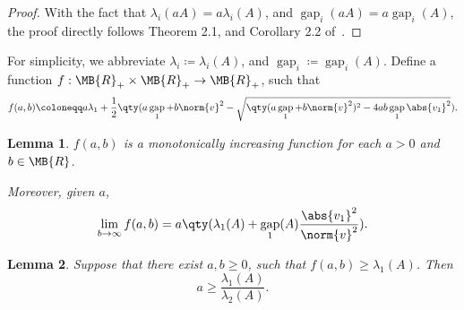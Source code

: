 \documentclass[nobib]{my-handout}
\newtheorem{lemma}{Lemma}
\theoremstyle{definition}
\theoremstyle{remark}
\DeclareMathOperator{\gap}{gap}
\begin{document}
\begin{proof}
	With the fact that $\lambda_i(a A) = a \lambda_i(A)$, and $\gap_i(a A) = a
	\gap_i(A)$, the proof directly follows Theorem 2.1, and Corollary 2.2
	of~\cite{ipsen_refined_2009}.
\end{proof}

For simplicity, we abbreviate $\lambda_i \coloneqq \lambda_i(A)$, and $\gap_i
\coloneqq \gap_i(A)$.  Define a function $f : \MB{R}_{+} \times
\MB{R}_{+} \to \MB{R}_{+}$, such that
\begin{equation}\label{eq:function_of_lmin_lbound}
	f(a,b) \coloneqq
	a \lambda_1 + \frac{1}{2} \qty(a \gap_1 + b \norm{v}^2 - \sqrt{\qty(a
	\gap_1 + b \norm{v}^2)^2 - 4 ab \gap_1 \abs{v_1}^2}).
\end{equation}

\begin{lemma}
	$f(a, b)$ is a monotonically increasing function for each $a > 0$ and $b
	\in \MB{R}$.

	Moreover, given $a$,
	\begin{equation*}
		\lim_{b \to \infty} f(a, b) = a \qty(\lambda_1(A) + \gap_1(A)
		\frac{\abs{v_1}^2}{\norm{v}^2}).
	\end{equation*}
\end{lemma}

\begin{lemma}
	Suppose that there exist $a, b \ge 0$, such that $f(a, b) \ge
	\lambda_1(A)$. Then
	\begin{equation}\label{eq:neccessary_cond_for_a}
		a \ge \frac{\lambda_1(A)}{\lambda_2(A)}.
	\end{equation}
\end{lemma}
\end{document}

